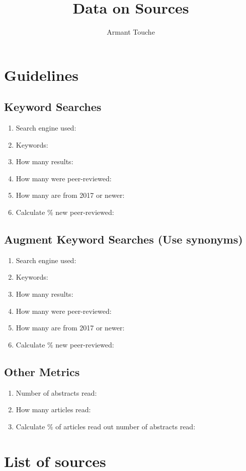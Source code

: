\documentclass{article}
\begin{document}
\title{\vspace{-2cm}Data on Sources}
\author{Armant Touche}
\maketitle

\section{Guidelines}

    \subsection{Keyword Searches}
    \begin{enumerate}

        \item Search engine used:
        \item Keywords:
        \item How many results:
        \item How many were peer-reviewed:
        \item How many are from 2017 or newer:
        \item Calculate \% new peer-reviewed:

    \end{enumerate}


    \subsection{Augment Keyword Searches (Use synonyms)}
    \begin{enumerate}

        \item Search engine used:
        \item Keywords:
        \item How many results:
        \item How many were peer-reviewed:
        \item How many are from 2017 or newer:
        \item Calculate \% new peer-reviewed:

    \end{enumerate}

    \subsection{Other Metrics}
    \begin{enumerate}

        \item Number of abstracts read:
        \item How many articles read: 
        \item Calculate \% of articles read out number of abstracts read:

    \end{enumerate}

\section{List of sources}
\end{document}
